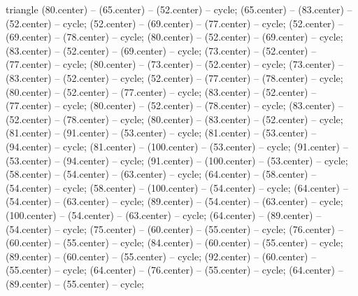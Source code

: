 \begin{pgfonlayer}{triangle}
 (80.center) -- (65.center) -- (52.center) -- cycle; 
 (65.center) -- (83.center) -- (52.center) -- cycle; 
 (52.center) -- (69.center) -- (77.center) -- cycle; 
 (52.center) -- (69.center) -- (78.center) -- cycle; 
 (80.center) -- (52.center) -- (69.center) -- cycle; 
 (83.center) -- (52.center) -- (69.center) -- cycle; 
 (73.center) -- (52.center) -- (77.center) -- cycle; 
 (80.center) -- (73.center) -- (52.center) -- cycle; 
 (73.center) -- (83.center) -- (52.center) -- cycle; 
 (52.center) -- (77.center) -- (78.center) -- cycle; 
 (80.center) -- (52.center) -- (77.center) -- cycle; 
 (83.center) -- (52.center) -- (77.center) -- cycle; 
 (80.center) -- (52.center) -- (78.center) -- cycle; 
 (83.center) -- (52.center) -- (78.center) -- cycle; 
 (80.center) -- (83.center) -- (52.center) -- cycle; 
 (81.center) -- (91.center) -- (53.center) -- cycle; 
 (81.center) -- (53.center) -- (94.center) -- cycle; 
 (81.center) -- (100.center) -- (53.center) -- cycle; 
 (91.center) -- (53.center) -- (94.center) -- cycle; 
 (91.center) -- (100.center) -- (53.center) -- cycle; 
 (58.center) -- (54.center) -- (63.center) -- cycle; 
 (64.center) -- (58.center) -- (54.center) -- cycle; 
 (58.center) -- (100.center) -- (54.center) -- cycle; 
 (64.center) -- (54.center) -- (63.center) -- cycle; 
 (89.center) -- (54.center) -- (63.center) -- cycle; 
 (100.center) -- (54.center) -- (63.center) -- cycle; 
 (64.center) -- (89.center) -- (54.center) -- cycle; 
 (75.center) -- (60.center) -- (55.center) -- cycle; 
 (76.center) -- (60.center) -- (55.center) -- cycle; 
 (84.center) -- (60.center) -- (55.center) -- cycle; 
 (89.center) -- (60.center) -- (55.center) -- cycle; 
 (92.center) -- (60.center) -- (55.center) -- cycle; 
 (64.center) -- (76.center) -- (55.center) -- cycle; 
 (64.center) -- (89.center) -- (55.center) -- cycle; 

\end{pgfonlayer}
